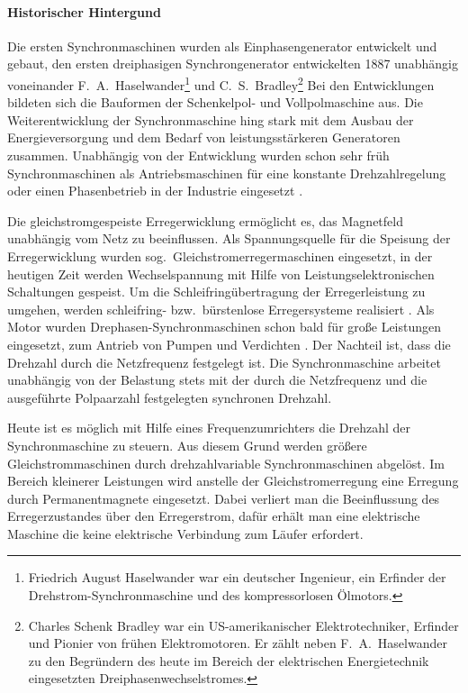 \paragraph{Historischer Hintergund} Die ersten Synchronmaschinen wurden als Einphasengenerator entwickelt und gebaut, den ersten dreiphasigen Synchrongenerator entwickelten 1887 unabhängig voneinander F.~A.~Haselwander\footnote{Friedrich August Haselwander war ein deutscher Ingenieur, ein Erfinder der Drehstrom-Synchronmaschine und des kompressorlosen Ölmotors.} und C.~S.~Bradley\footnote{Charles Schenk Bradley war ein US-amerikanischer Elektrotechniker, Erfinder und Pionier von frühen Elektromotoren. Er zählt neben F.~A.~Haselwander zu den Begründern des heute im Bereich der elektrischen Energietechnik eingesetzten Dreiphasenwechselstromes.} Bei den Entwicklungen bildeten sich die Bauformen der Schenkelpol- und Vollpolmaschine aus. Die Weiterentwicklung der Synchronmaschine hing stark mit dem Ausbau der Energieversorgung und dem Bedarf von leistungsstärkeren Generatoren zusammen. Unabhängig von der Entwicklung wurden schon sehr früh Synchronmaschinen als Antriebsmaschinen für eine konstante Drehzahlregelung oder einen Phasenbetrieb in der Industrie eingesetzt \autocites[S.~287]{fischer2009}[S.~485f.]{mullerI2005}.

Die gleichstromgespeiste Erregerwicklung ermöglicht es, das Magnetfeld unabhängig vom Netz zu beeinflussen.
Als Spannungsquelle für die Speisung der Erregerwicklung wurden sog.\ Gleichstromerregermaschinen eingesetzt, in der heutigen Zeit werden Wechselspannung mit Hilfe von Leistungselektronischen Schaltungen gespeist.
Um die Schleifringübertragung der Erregerleistung zu umgehen, werden schleifring- bzw.\ bürstenlose Erregersysteme realisiert \autocite[S.~108]{ternes2012}.
Als Motor wurden Drephasen-Synchronmaschinen schon bald für große Leistungen eingesetzt, \zB zum Antrieb von Pumpen und Verdichten \autocite[S.~486]{mullerI2005}.
Der Nachteil ist, dass die Drehzahl durch die Netzfrequenz festgelegt ist.
Die Synchronmaschine arbeitet unabhängig von der Belastung stets mit der durch die Netzfrequenz und die ausgeführte Polpaarzahl festgelegten synchronen Drehzahl.

Heute ist es möglich mit Hilfe eines Frequenzumrichters die Drehzahl der Synchronmaschine zu steuern.
Aus diesem Grund werden größere Gleichstrommaschinen durch drehzahlvariable Synchronmaschinen abgelöst.
Im Bereich kleinerer Leistungen wird anstelle der Gleichstromerregung eine Erregung durch Permanentmagnete eingesetzt.
Dabei verliert man die Beeinflussung des Erregerzustandes über den Erregerstrom, dafür erhält man eine elektrische Maschine die keine elektrische Verbindung zum Läufer erfordert.

